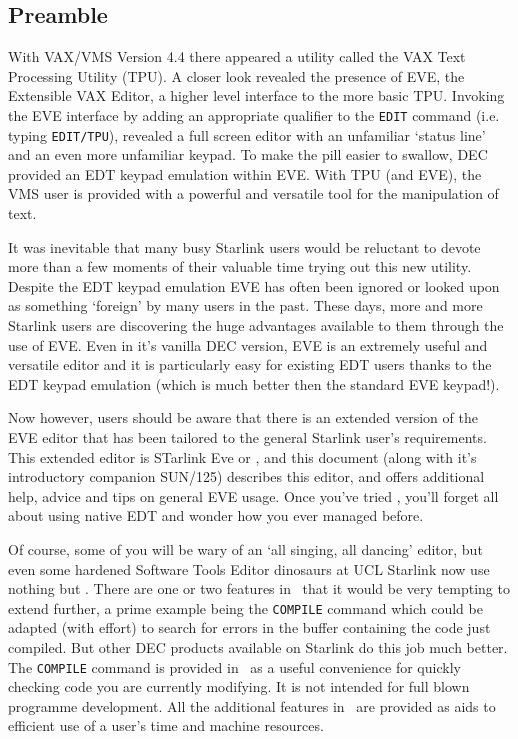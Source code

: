 \subsection{Preamble}
With VAX/VMS Version 4.4 there appeared a utility called the VAX Text
Processing Utility (TPU). A closer look revealed the presence of EVE, the
Extensible VAX Editor, a higher level interface to the more basic TPU. Invoking
the EVE interface by adding an appropriate  qualifier to the {\tt EDIT} command
(i.e. typing {\tt EDIT/TPU}), revealed a full screen editor with an unfamiliar
`status line' and an even more unfamiliar keypad. To make the pill easier to
swallow, DEC provided an EDT keypad emulation within EVE. With TPU (and EVE),
the VMS user is provided with a powerful and versatile tool for the
manipulation of text.

It was inevitable that many busy Starlink users would be reluctant to devote
more than a few moments of their valuable time trying out this new utility.
Despite the EDT keypad emulation EVE has often been ignored or looked upon as
something `foreign' by many users in the past. These days, more and more
Starlink users are discovering the huge advantages available to them through
the use of EVE. Even in it's vanilla DEC version, EVE is an extremely useful
and versatile editor and it is particularly easy for existing EDT users thanks
to the EDT keypad emulation (which is much better then the standard EVE
keypad!).

Now however, users should be aware that there is an extended version of the EVE
editor that has been tailored to the general Starlink user's requirements.
This extended editor is STarlink Eve or \STEve, and this document (along
with it's introductory companion SUN/125) describes this editor, and offers
additional help, advice and tips on general EVE usage. Once you've tried
\STEve, you'll forget all about using native EDT and wonder how you ever managed
before.

Of course, some of you will be wary of an `all singing, all dancing' editor,
but even some hardened Software Tools Editor dinosaurs at UCL Starlink now use
nothing but \STEve. There are one or two features in \STEve\ that it would be
very tempting to extend further, a prime example being the {\tt COMPILE}
command which could be adapted (with effort) to search for errors in the buffer
containing the code just compiled. But other DEC products available on Starlink
do this job much better. The {\tt COMPILE} command is provided in \STEve\ as a
useful convenience for quickly checking code you are currently modifying. It is
not intended for full blown programme development. All the additional features
in \STEve\ are provided as aids to efficient use of a user's time and machine
resources.

